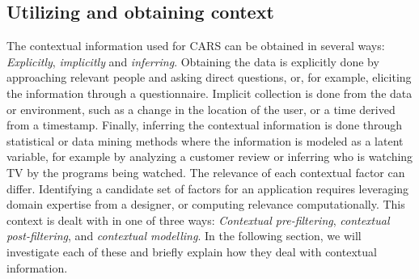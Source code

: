 \subsection{Utilizing and obtaining context}\label{subsec:utilizingandobtainingcontext}
The contextual information used for CARS can be obtained in several ways: \textit{Explicitly}, \textit{implicitly} and \textit{inferring}\cite{RecommenderHandbook2015}.
Obtaining the data is explicitly done by approaching relevant people and asking direct questions, or, for example, eliciting the information through a questionnaire.
Implicit collection is done from the data or environment, such as a change in the location of the user, or a time derived from a timestamp.
Finally, inferring the contextual information is done through statistical or data mining methods where the information is modeled as a latent variable, for example by analyzing a customer review or inferring who is watching TV by the programs being watched.
The relevance of each contextual factor can differ.
Identifying a candidate set of factors for an application requires leveraging domain expertise from a designer, or computing relevance computationally.
This context is dealt with in one of three ways\cite{Adomavicius2011}: \textit{Contextual pre-filtering}, \textit{contextual post-filtering}, and \textit{contextual modelling}.
In the following section, we will investigate each of these and briefly explain how they deal with contextual information.

